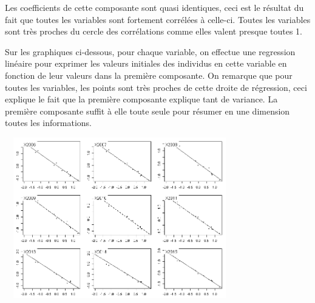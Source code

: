 \documentclass{article}
\begin{document}
Les coefficients de cette composante sont quasi identiques, ceci est le résultat du fait que toutes les variables sont fortement corrélées à celle-ci. Toutes les variables sont très proches du cercle des corrélations comme elles valent presque toutes 1.

Sur les graphiques ci-dessous, pour chaque variable, on effectue une regression linéaire pour exprimer les valeurs initiales des individus en cette variable en fonction de leur valeurs dans la première composante. On remarque que pour toutes les variables, les points sont très proches de cette droite de régression, ceci explique le fait que la première composante explique tant de variance. La première composante suffit à elle toute seule pour résumer en une dimension toutes les informations.

	\includegraphics[width=10cm,height=7cm]{"score"} 
	
\end{document}
